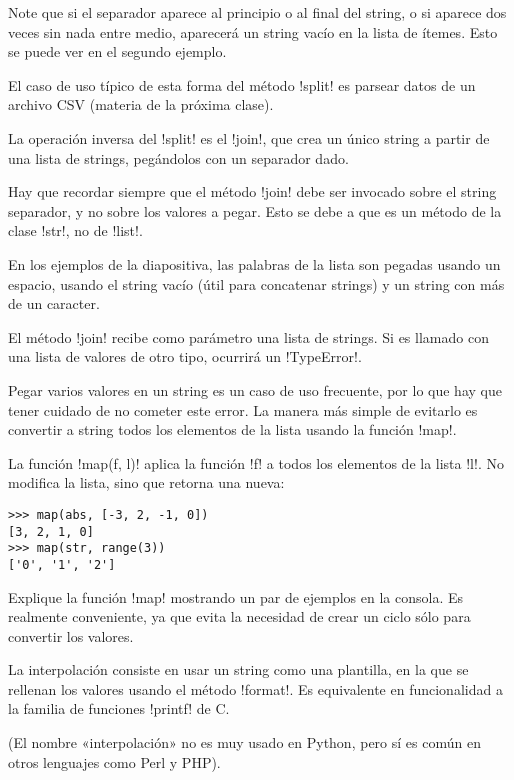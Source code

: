 \documentclass[10pt]{article}
\begin{document}
  Note que si el separador aparece al principio o al final del string,
  o si aparece dos veces sin nada entre medio,
  aparecerá un string vacío en la lista de ítemes.
  Esto se puede ver en el segundo ejemplo.

  El caso de uso típico de esta forma del método \li!split!
  es parsear datos de un archivo CSV (materia de la próxima clase).


  La operación inversa del \li!split! es el \li!join!,
  que crea un único string a partir de una lista de strings,
  pegándolos con un separador dado.

  Hay que recordar siempre
  que el método \li!join! debe ser invocado sobre el string separador,
  y no sobre los valores a pegar.
  Esto se debe a que es un método de la clase \li!str!, no de \li!list!.

  En los ejemplos de la diapositiva,
  las palabras de la lista son pegadas
  usando un espacio, usando el string vacío (útil para concatenar strings)
  y un string con más de un caracter.


  El método \li!join! recibe como parámetro una lista de strings.
  Si es llamado con una lista de valores de otro tipo,
  ocurrirá un \li!TypeError!.

  Pegar varios valores en un string es un caso de uso frecuente,
  por lo que hay que tener cuidado de no cometer este error.
  La manera más simple de evitarlo
  es convertir a string todos los elementos de la lista
  usando la función \li!map!.

  La función \li!map(f, l)!
  aplica la función \li!f! a todos los elementos de la lista \li!l!.
  No modifica la lista, sino que retorna una nueva:
\begin{lstlisting}
>>> map(abs, [-3, 2, -1, 0])
[3, 2, 1, 0]
>>> map(str, range(3))
['0', '1', '2']
\end{lstlisting}
  Explique la función \li!map! mostrando un par de ejemplos en la consola.
  Es realmente conveniente,
  ya que evita la necesidad de crear un ciclo sólo para convertir los valores.


  La interpolación consiste en usar un string como una plantilla,
  en la que se rellenan los valores usando el método \li!format!.
  Es equivalente en funcionalidad a la familia de funciones \li!printf! de C.

  (El nombre «interpolación» no es muy usado en Python,
  pero sí es común en otros lenguajes como Perl y PHP).
\end{document}
